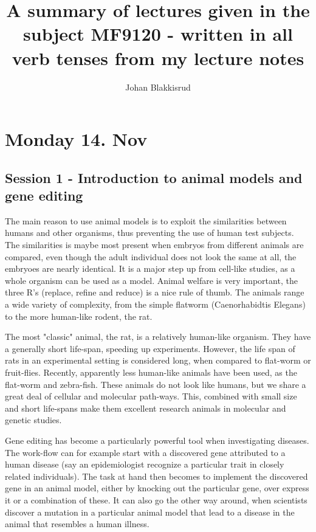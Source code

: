 \documentclass[12p]{article}
\title{A summary of lectures given in the subject MF9120 - written in all verb tenses from my lecture notes}
\author{Johan Blakkisrud}
\begin{document}
\maketitle

\section*{Monday 14. Nov}

\subsection*{Session 1 - Introduction to animal models and gene editing}
The main reason to use animal models is to exploit the similarities between humans and other organisms, thus preventing the use of human test subjects.
The similarities is maybe most present when embryos from different animals are compared, even though the adult individual does not look the same at all, the embryoes are nearly identical.
It is a major step up from cell-like studies, as a whole organism can be used as a model.
Animal welfare is very important, the three R's (replace, refine and reduce) is a nice rule of thumb.
The animals range a wide variety of complexity, from the simple flatworm (Caenorhabidtis Elegans) to the more human-like rodent, the rat.

The most "classic" animal, the rat, is a relatively human-like organism.
They have a generally short life-span, speeding up experiments.
However, the life span of rats in an experimental setting is considered long, when compared to flat-worm or fruit-flies.
Recently, apparently less human-like animals have been used, as the flat-worm and zebra-fish.
These animals do not look like humans, but we share a great deal of cellular and molecular path-ways.
This, combined with small size and short life-spans make them excellent research animals in molecular and genetic studies.

Gene editing has become a particularly powerful tool when investigating diseases.
The work-flow can for example start with a discovered gene attributed to a human disease (say an epidemiologist recognize a particular trait in closely related individuals).
The task at hand then becomes to implement the discovered gene in an animal model, either by knocking out the particular gene, over express it or a combination of these.
It can also go the other way around, when scientists discover a mutation in a particular animal model that lead to a disease in the animal that resembles a human illness.
\end{document}
